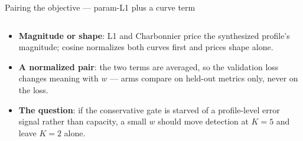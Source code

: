 \begin{frame}{Pairing the objective --- param-L1 plus a curve term}
\begin{columns}[c]
\begin{column}{0.43\textwidth}
\begin{itemize}
              through its matched pair; the curve term re-synthesizes the
              profile from \emph{all} slots and is permutation-invariant ---
              its gradient touches every slot, matched or not.
        \item \textbf{Magnitude or shape}: L1 and Charbonnier price the
              synthesized profile's magnitude; cosine normalizes both curves
              first and prices shape alone.
        \item \textbf{A normalized pair}: the two terms are averaged, so the
              validation loss changes meaning with $w$ --- arms compare on
              held-out metrics only, never on the loss.
        \item \textbf{The question}: if the conservative gate is starved of a
              profile-level error signal rather than capacity, a small $w$
              should move detection at $K{=}5$ and leave $K{=}2$ alone.
      \end{itemize}
    \end{column}
  \end{columns}
\end{frame}

